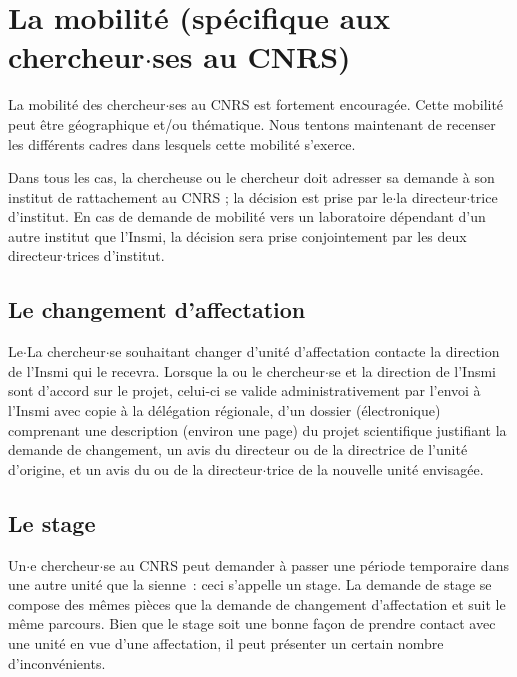 \section{La mobilit\'e (sp\'ecifique aux chercheur$\cdot$ses au CNRS)}


La mobilit\'e des chercheur$\cdot$ses au CNRS est fortement encourag\'ee.
Cette mobilit\'e peut \^etre g\'eo\-gra\-phi\-que et/ou
th\'ematique. Nous tentons maintenant de recenser les
diff\'erents cadres dans lesquels cette mobilit\'e s'exerce.

Dans tous les cas, la chercheuse ou le chercheur doit adresser sa demande \`a son institut de rattachement au CNRS ; la d\'ecision est prise par le$\cdot$la directeur$\cdot$trice d'institut. En  cas de demande de mobilit\'e vers un laboratoire d\'ependant d'un autre institut que l'Insmi, la d\'ecision sera prise conjointement par les deux directeur$\cdot$trices d'institut. 

\subsection{Le changement d'affectation}

Le$\cdot$La chercheur$\cdot$se  souhaitant changer d'unit\'e d'affectation contacte la direction de l'Insmi qui le recevra. Lorsque la ou le chercheur$\cdot$se et la direction de l'Insmi sont d'accord sur le projet, celui-ci se valide administrativement par l'envoi \`a l'Insmi 
avec copie \`a la d\'el\'egation r\'egionale, d'un dossier (\'electronique)
comprenant une description (environ une page) du projet scientifique
justifiant la demande de changement, un avis du directeur ou de la directrice
de l'unit\'e d'origine, et un avis du ou de la directeur$\cdot$trice de la nouvelle
unit\'e envisag\'ee.


\subsection{Le stage}

Un$\cdot$e chercheur$\cdot$se au CNRS peut demander \`a passer une p\'eriode
temporaire dans une autre unit\'e que la sienne~: ceci s'appelle
un stage. La demande de stage se compose des m\^emes pi\`eces
que la demande de changement d'affectation et suit le m\^eme
parcours. Bien que le stage soit une bonne fa\c con de prendre
contact avec une unit\'e en vue d'une affectation, il peut pr\'esenter
un certain nombre d'inconv\'enients.

